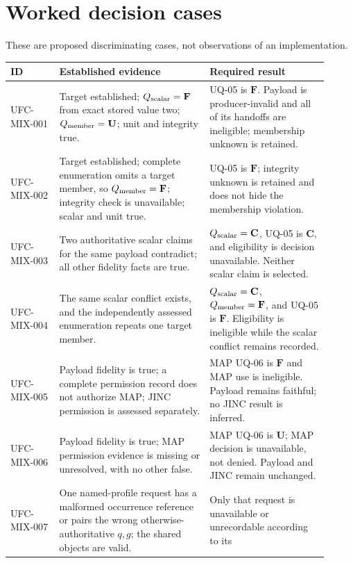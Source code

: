 \ifengineeringview

\section{Worked decision cases}

These are proposed discriminating cases, not observations of an
implementation.

\begin{longtable}{p{0.14\linewidth}p{0.43\linewidth}p{0.34\linewidth}}
\toprule
ID & Established evidence & Required result\\
\midrule
\endhead
UFC-MIX-001 & Target established; \(Q_{\rm scalar}=\mathbf F\) from exact
stored value two; \(Q_{\rm member}=\mathbf U\); unit and integrity true. &
UQ-05 is \(\mathbf F\). Payload is producer-invalid and all of its handoffs
are ineligible; membership unknown is retained.\\
UFC-MIX-002 & Target established; complete enumeration omits a target member,
so \(Q_{\rm member}=\mathbf F\); integrity check is unavailable; scalar and
unit true. & UQ-05 is \(\mathbf F\); integrity unknown is retained and does
not hide the membership violation.\\
UFC-MIX-003 & Two authoritative scalar claims for the same payload contradict;
all other fidelity facts are true. & \(Q_{\rm scalar}=\mathbf C\), UQ-05 is
\(\mathbf C\), and eligibility is decision unavailable. Neither scalar claim
is selected.\\
UFC-MIX-004 & The same scalar conflict exists, and the independently assessed
enumeration repeats one target member. & \(Q_{\rm scalar}=\mathbf C\),
\(Q_{\rm member}=\mathbf F\), and UQ-05 is \(\mathbf F\). Eligibility is
ineligible while the scalar conflict remains recorded.\\
UFC-MIX-005 & Payload fidelity is true; a complete permission record does not
authorize MAP; JINC permission is assessed separately. & MAP UQ-06 is
\(\mathbf F\) and MAP use is ineligible. Payload remains faithful; no JINC
result is inferred.\\
UFC-MIX-006 & Payload fidelity is true; MAP permission evidence is missing or
unresolved, with no other false. & MAP UQ-06 is \(\mathbf U\); MAP decision is
unavailable, not denied. Payload and JINC remain unchanged.\\
UFC-MIX-007 & One named-profile request has a malformed occurrence reference
or pairs the wrong otherwise-authoritative \(q,g\); the shared objects are
valid. & Only that request is unavailable or unrecordable according to its

\end{longtable}
